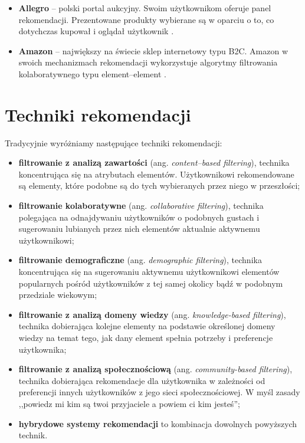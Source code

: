 \documentclass[twoside]{iisthesis}
\begin{document}
	 \begin{itemize}
	 	\item \textbf{Allegro} -- polski portal aukcyjny. Swoim użytkownikom oferuje panel rekomendacji. Prezentowane produkty wybierane są w oparciu o to, co dotychczas kupował i oglądał użytkownik \cite{id:allegrofaq}. 
	 	\item \textbf{Amazon} -- największy na świecie sklep internetowy typu B2C. Amazon w swoich mechanizmach rekomendacji wykorzystuje algorytmy filtrowania kolaboratywnego typu element--element \cite{id:linden2003amazon}.
	 \end{itemize}	 
	 
	 
	 
	 \section{Techniki rekomendacji}
 
	 Tradycyjnie wyróżniamy następujące techniki rekomendacji: 
	 
	 \begin{itemize}
	 	\item \textbf{filtrowanie z analizą zawartości} (ang. \textit{content--based filtering}), technika koncentrująca się na atrybutach elementów. Użytkownikowi rekomendowane są elementy, które podobne są do tych wybieranych przez niego w przeszłości;
	 	\item \textbf{filtrowanie kolaboratywne} (ang. \textit{collaborative filtering}), technika polegająca na odnajdywaniu użytkowników o podobnych gustach i sugerowaniu lubianych przez nich elementów aktualnie aktywnemu użytkownikowi;
	 	\item \textbf{filtrowanie demograficzne} (ang. \textit{demographic filtering}), technika koncentrująca się na sugerowaniu aktywnemu użytkownikowi elementów popularnych pośród użytkowników z tej samej okolicy bądź w podobnym przedziale wiekowym;
	 	\item \textbf{filtrowanie z analizą domeny wiedzy} (ang. \textit{knowledge-based filtering}), technika dobierająca kolejne elementy na podstawie określonej domeny wiedzy na temat tego, jak dany element spełnia potrzeby i preferencje użytkownika;	
	 	\item \textbf{filtrowanie z analizą społecznościową} (ang. \textit{community-based filtering}), technika dobierająca rekomendacje dla użytkownika w zależności od preferencji innych użytkowników z jego sieci społecznościowej. W myśl zasady ,,powiedz mi kim są twoi przyjaciele a powiem ci kim jesteś'';
	 	\item \textbf{hybrydowe systemy rekomendacji} to kombinacja dowolnych powyższych technik.
	 \end{itemize}
	 
\end{document}
